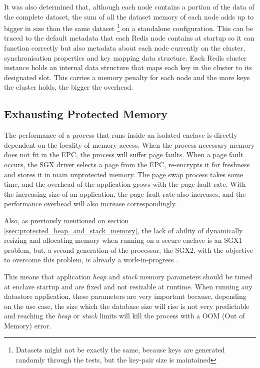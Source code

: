 It was also determined that, although each node contains a portion of the data of the complete dataset, the sum of all the dataset memory of each node adds up to bigger in size than the same dataset \footnote{Datasets might not be exactly the same, because keys are generated randomly through the tests, but the key-pair size is maintained} on a standalone configuration. This can be traced to the default metadata that each Redis node contains at startup so it can function correctly but also metadata about each node currently on the cluster, synchronisation properties and key mapping data structure. Each Redis cluster instance holds an internal data structure that maps each key in the cluster to its designated slot. This carries a memory penalty for each node and the more keys the cluster holds, the bigger the overhead.

\subsection{Exhausting Protected Memory}
\label{ssec:exhausting_protected_memory}

The performance of a process that runs inside an isolated enclave is directly dependent on the locality of memory access. When the process necessary memory does not fit in the \gls{EPC}, the process will suffer page faults. When a page fault occurs, the \gls{SGX} driver selects a page from the \gls{EPC}, re-encrypts it for freshness and stores it in main unprotected memory. The page swap process takes some time, and the overhead of the application grows with the page fault rate. With the increasing size of an application, the page fault rate also increases, and the performance overhead will also increase correspondingly.  

Also, as previously mentioned on section \ref{ssec:protected_heap_and_stack_memory}, the lack of ability of dynamically resizing and allocating memory when running on a secure enclave is an \gls{SGX}1 problem, but, a second generation of the processor, the \gls{SGX}2, with the objective to overcome this problem, is already a work-in-progress \cite{Xing2016}.

This means that application \textit{heap} and \textit{stack} memory parameters should be tuned at enclave startup and are fixed and not resizable at runtime. When running any datastore application, these parameters are very important because, depending on the use case, the size which the database size will rise is not very predictable and reaching the \textit{heap} or \textit{stack} limits will kill the process with a \gls{OOM} (Out of Memory) error.

